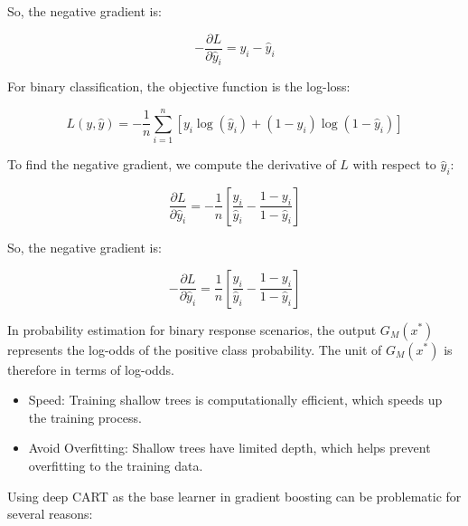 \documentclass[12pt]{article}
\begin{document}
\begin{enumerate}
So, the negative gradient is:

\[
-\frac{\partial L}{\partial \hat{y}_i} = y_i - \hat{y}_i
\]



For binary classification, the objective function is the log-loss:

\[
L(y, \hat{y}) = -\frac{1}{n} \sum_{i=1}^{n} \left[ y_i \log(\hat{y}_i) + (1 - y_i) \log(1 - \hat{y}_i) \right]
\]

To find the negative gradient, we compute the derivative of \(L\) with respect to \(\hat{y}_i\):

\[
\frac{\partial L}{\partial \hat{y}_i} = -\frac{1}{n} \left[ \frac{y_i}{\hat{y}_i} - \frac{1 - y_i}{1 - \hat{y}_i} \right]
\]

So, the negative gradient is:

\[
-\frac{\partial L}{\partial \hat{y}_i} = \frac{1}{n} \left[ \frac{y_i}{\hat{y}_i} - \frac{1 - y_i}{1 - \hat{y}_i} \right]
\]


In probability estimation for binary response scenarios, the output \( G_M(x^*) \) represents the log-odds of the positive class probability. The unit of \( G_M(x^*) \) is therefore in terms of log-odds.


\begin{itemize}
    \item Speed: Training shallow trees is computationally efficient, which speeds up the training process.
    \item Avoid Overfitting: Shallow trees have limited depth, which helps prevent overfitting to the training data.
\end{itemize}


Using deep CART as the base learner in gradient boosting can be problematic for several reasons:


\end{enumerate}
\end{document}
